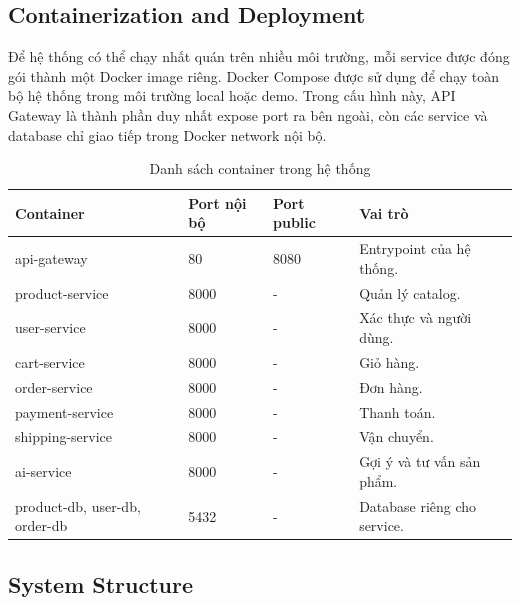 \documentclass[../main.tex]{subfiles}
\begin{document}
\subsection{Containerization and Deployment}
\label{subsection:4.2.5}

Để hệ thống có thể chạy nhất quán trên nhiều môi trường, mỗi service được đóng gói thành một Docker image riêng. Docker Compose được sử dụng để chạy toàn bộ hệ thống trong môi trường local hoặc demo. Trong cấu hình này, API Gateway là thành phần duy nhất expose port ra bên ngoài, còn các service và database chỉ giao tiếp trong Docker network nội bộ.

\begin{table}[H]
    \centering
    \caption{Danh sách container trong hệ thống}
    \label{tab:chapter4-containers}
    \begin{tabular}{|p{}|p{}|p{}|p{}|}
        \hline
        \rowcolor{primary!35}
        \textbf{Container} & \textbf{Port nội bộ} & \textbf{Port public} & \textbf{Vai trò} \\
        \hline
        api-gateway & 80 & 8080 & Entrypoint của hệ thống. \\
        \hline
        product-service & 8000 & - & Quản lý catalog. \\
        \hline
        user-service & 8000 & - & Xác thực và người dùng. \\
        \hline
        cart-service & 8000 & - & Giỏ hàng. \\
        \hline
        order-service & 8000 & - & Đơn hàng. \\
        \hline
        payment-service & 8000 & - & Thanh toán. \\
        \hline
        shipping-service & 8000 & - & Vận chuyển. \\
        \hline
        ai-service & 8000 & - & Gợi ý và tư vấn sản phẩm. \\
        \hline
        product-db, user-db, order-db & 5432 & - & Database riêng cho service. \\
        \hline
    \end{tabular}
\end{table}

\subsection{System Structure}
\label{subsection:4.2.6}
\end{document}
